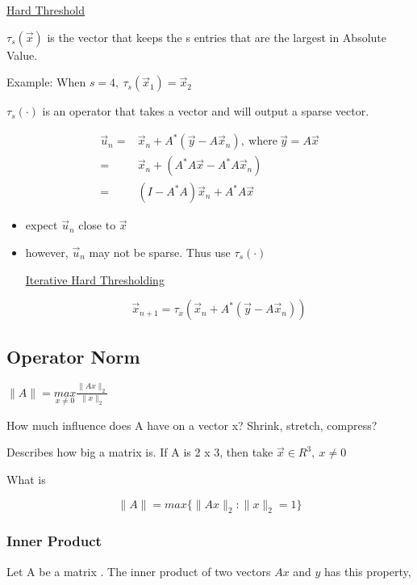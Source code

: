\documentclass[11pt]{article}
\begin{document}
\uline{Hard Threshold}

\(\tau_s(\vec x)\) is the vector that keeps the s entries that are the largest in
Absolute Value.

Example: When \(s = 4, \ \tau_s(\vec x_1) = \vec x_2\)

\(\tau_s (\cdot)\) is an operator that takes a vector and will output a sparse vector.


\begin{subequations}
\label{first:main2}
\begin{align}
\vec u_n = & \vec x_n + A^* (\vec y - A \vec x_n), \ \text{where} \ \vec y = A \vec x\\
= & \vec x_n + (A^* A \vec x - A^* A \vec x_n)\\
= & (I - A^* A)\vec x_n + A^* A \vec x
\end{align}
\end{subequations}


\begin{itemize}
\item expect \(\vec u_n\) close to \(\vec x\)
\item however, \(\vec u_n\) may not be sparse. Thus use \(\tau_s(\cdot)\)

\uline{Iterative Hard Thresholding}

$$
  \vec x_{n + 1} = \tau_x (\vec x_n + A^* (\vec y - A \vec x_n))
  $$
\end{itemize}
\subsection{Operator Norm}
\label{sec:org5933cfb}

\(\| A \| = \underset{x \neq 0}{max} \frac{\| Ax \|_2}{\| x \|_2}\)

How much influence does A have on a vector x? Shrink, stretch, compress?

Describes how big a matrix is. If A is 2 x 3, then take \(\vec x \in R^3, \ x
\neq 0\)

What is

$$
\| A \| = max\{ \| Ax \|_2 \colon \| x \|_2 = 1 \}
$$

\subsubsection{Inner Product}
\label{sec:org51d19f9}

Let A be a matrix . The inner product of two vectors \(Ax\) and \(y\) has this
property,
\end{document}
